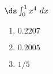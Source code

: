 {$\ds \int_{0}^{1} x^4\ dx$}
{\begin{enumerate}
\item		$0.2207$
\item		$0.2005$
\item		$1/5$
\end{enumerate}
}